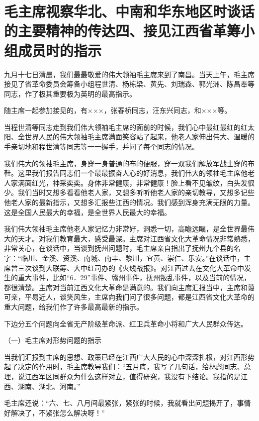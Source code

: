 \section[毛主席视察华北、中南和华东地区时谈话的主要精神的传达四、接见江西省革筹小组成员时的指示]{毛主席视察华北、中南和华东地区时谈话的主要精神的传达四、接见江西省革筹小组成员时的指示}


九月十七日清晨，我们最最敬爱的伟大领袖毛主席来到了南昌。当天上午，毛主席接见了省革命委员会筹备小组程世清、杨栋梁、黄先、刘瑞森、郭光洲、陈昌奉等同志，作了极其重要极为英明的最高指示。

随主席一起参加接见的，有×××，张春桥同志，汪东兴同志，和×××等。

当程世清等同志走到我们伟大领袖毛主席的面前的时候，我们心中最红最红的红太阳、全世界人民的伟大领袖毛主席满面笑容站了起来，他老人家伸出伟大、温暖的手亲切地和程世清等同志等一一握手，并问了每个同志的情况。

我们伟大的领袖毛主席，身穿一身普通的布的便服，穿一双我们解放军战士穿的布鞋。这里我们报告同志们一个最最振奋人心的好消息，我们伟大的领袖毛主席他老人家满面红光，神采奕奕。身体非常健康，非常健康！脸上看不见皱纹，白头发很少。我们当时又想多看看他老人家，又想多听听他老人家的亲切教导，又想多记些他老人家的最新指示，又想多汇报些江西的情况。我们感到浑身充满无限的力量。这是全国人民最大的幸福，是全世界人民最大的幸福。

我们伟大领袖毛主席他老人家记忆力非常好，洞悉一切，高瞻远瞩，是全世界最伟大的天才。对我们教育最大，感受最深。主席对江西省文化大革命情况非常熟悉，非常关心，在谈话中，当谈到抚州问题时，毛主席亲自指出了抚州九个县的名字：“临川、金溪、资溪、南城、南丰、黎川，宜黄、崇仁、乐安。”在谈话中，主席曾三次谈到大联筹、大中红司办的《火线战报》。对江西过去在文化大革命中发生的重大事件，比如“6．29”事件、赣州事件，抚州叛乱事件，以及当前的情况，都很清楚。主席对当前江西文化大革命是满意的。我们向主席汇报当中，主席和蔼可亲，平易近人，谈笑风生，主席向我们问了很多问题，都是江西省文化大革命的重大问题，给我们作了许多最高最新的指示。

下边分五个问题向全省无产阶级革命派、红卫兵革命小将和广大人民群众传达。

（一）毛主席对形势问题的指示

当我们汇报到主席的思想、政策已经在江西广大人民的心中深深扎根，对江西形势起了决定的作用时，毛主席教导我们：“五月底，我写了几句话，给林彪同志、总理，说江西军区同群众为什么这样对立，值得研究，我没有下结论。我指的是江西、湖南、湖北、河南。”

毛主席还说：“六、七、八月间最紧张，紧张的时候，我就看出问题揭开了，事情好解决了，不紧张怎么解决呀！”

